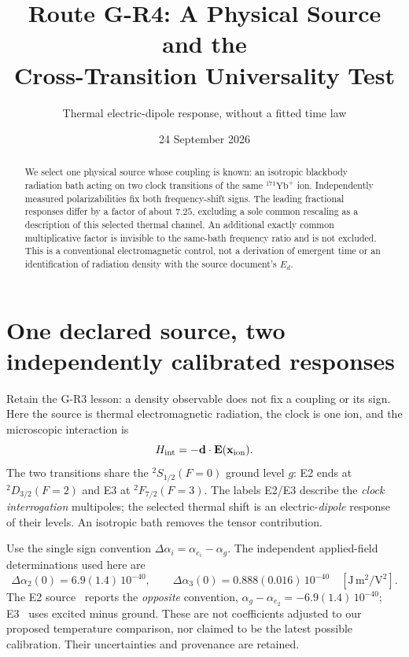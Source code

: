 \documentclass[11pt,a4paper]{article}
\title{Route G-R4: A Physical Source and the\protect\\Cross-Transition Universality Test}
\author{Thermal electric-dipole response, without a fitted time law}
\date{24 September 2026}
\begin{document}
\maketitle
\begin{abstract}
We select one physical source whose coupling is known: an isotropic
blackbody radiation bath acting on two clock transitions of the same
$^{171}\mathrm{Yb}^+$ ion. Independently measured polarizabilities fix
both frequency-shift signs. The leading fractional responses differ
by a factor of about $7.25$, excluding a sole common rescaling as a
description of this selected thermal channel. An additional exactly
common multiplicative factor is invisible to the same-bath frequency
ratio and is not excluded. This is a conventional electromagnetic
control, not a derivation of emergent time or an identification of
radiation density with the source document's $E_d$.
\end{abstract}

\section{One declared source, two independently calibrated responses}
Retain the G-R3 lesson: a density observable does not fix a coupling
or its sign. Here the source is thermal electromagnetic radiation,
the clock is one ion, and the microscopic interaction is
\begin{equation}\label{eq:interaction}
 H_{\rm int}=-\mathbf d\cdot\mathbf E(\mathbf x_{\rm ion}).
\end{equation}
The two transitions share the $^2S_{1/2}(F=0)$ ground level $g$:
E2 ends at $^2D_{3/2}(F=2)$ and E3 at $^2F_{7/2}(F=3)$.
The labels E2/E3 describe the \emph{clock interrogation} multipoles;
the selected thermal shift is an electric-\emph{dipole} response of
their levels. An isotropic bath removes the tensor contribution.

Use the single sign convention $\Delta\alpha_i=\alpha_{e_i}-\alpha_g$.
The independent applied-field determinations used here are
\begin{equation}\label{eq:inputs}
 \Delta\alpha_2(0)=6.9(1.4)\,10^{-40},\qquad
 \Delta\alpha_3(0)=0.888(0.016)\,10^{-40}
 \quad [\mathrm{J\,m^2/V^2}].
\end{equation}
The E2 source~\cite{schneider} reports the \emph{opposite} convention,
$\alpha_g-\alpha_{e_2}=-6.9(1.4)\,10^{-40}$; E3~\cite{huntemann}
uses excited minus ground. These are not coefficients adjusted to
our proposed temperature comparison, nor claimed to be the latest
possible calibration. Their uncertainties and provenance are retained.
\end{document}
